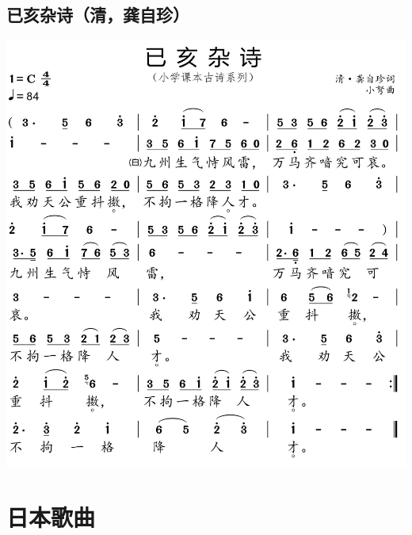 \documentclass[cn,pad,chinesefont=nofont]{elegantbook}
\begin{document}
\section{已亥杂诗（清，龚自珍）}
    \includegraphics[width=\textwidth]{dongxiao/20200627-古诗-龚自珍-已亥杂诗.jpg}   

\chapter{日本歌曲}
\end{document}
